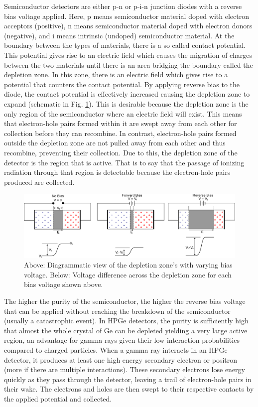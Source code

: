 Semiconductor detectors are either p-n or p-i-n junction diodes with a reverse bias voltage applied. Here, p means semiconductor material doped with electron acceptors (positive), n means semiconductor material doped with electron donors (negative), and i means intrinsic (undoped) semiconductor material. At the boundary between the types of materials, there is a so called contact potential. This potential gives rise to an electric field which causes the migration of charges between the two materials until there is an area bridging the boundary called the depletion zone. In this zone, there is an electric field which gives rise to a potential that counters the contact potential. By applying reverse bias to the diode, the contact potential is effectively increased causing the depletion zone to expand (schematic in Fig. \ref{fig:chp3-pn_diode}). This is desirable because the depletion zone is the only region of the semiconductor where an electric field will exist. This means that electron-hole pairs formed within it are swept away from each other for collection before they can recombine. In contrast, electron-hole pairs formed outside the depletion zone are not pulled away from each other and thus recombine, preventing their collection. Due to this, the depletion zone of the detector is the region that is active. That is to say that the passage of ionizing radiation through that region is detectable because the electron-hole pairs produced are collected.

\begin{figure}[h!]
	\centerline{\includegraphics[width=\textwidth]{./img/c3/pn-diode.eps}}
	\caption{Above: Diagrammatic view of the depletion zone's with varying bias voltage. Below: Voltage difference across the depletion zone for each bias voltage shown above.}
	\label{fig:chp3-pn_diode}
\end{figure}

The higher the purity of the semiconductor, the higher the reverse bias voltage that can be applied without reaching the breakdown of the semiconductor (usually a catastrophic event). In HPGe detectors, the purity is sufficiently high that almost the whole crystal of Ge can be depleted yielding a very large active region, an advantage for gamma rays given their low interaction probabilities compared to charged particles. When a gamma ray interacts in an HPGe detector, it produces at least one high energy secondary electron or positron (more if there are multiple interactions). These secondary electrons lose energy quickly as they pass through the detector, leaving a trail of electron-hole pairs in their wake. The electrons and holes are then swept to their respective contacts by the applied potential and collected.

